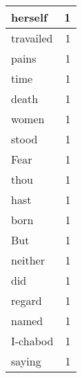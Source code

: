 \begin{center}
\begin{longtable}{l|r}
herself & 1 \\ \hline
travailed & 1 \\ \hline
pains & 1 \\ \hline
time & 1 \\ \hline
death & 1 \\ \hline
women & 1 \\ \hline
stood & 1 \\ \hline
Fear & 1 \\ \hline
thou & 1 \\ \hline
hast & 1 \\ \hline
born & 1 \\ \hline
But & 1 \\ \hline
neither & 1 \\ \hline
did & 1 \\ \hline
regard & 1 \\ \hline
named & 1 \\ \hline
I-chabod & 1 \\ \hline
saying & 1 \\ \hline
\end{longtable}
\end{center}



\normalsize



